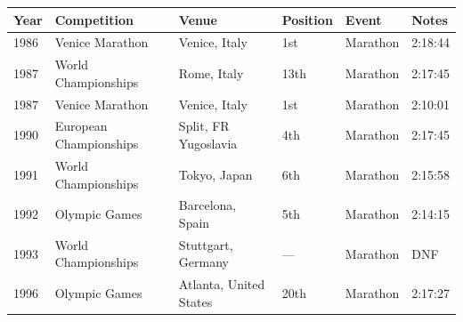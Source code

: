 \documentclass{article}
\begin{document}
\begin{tabular}{llllll}
\toprule
Year & Competition & Venue & Position & Event & Notes \\
\midrule
1986 & Venice Marathon & Venice, Italy & 1st & Marathon & 2:18:44 \\
1987 & World Championships & Rome, Italy & 13th & Marathon & 2:17:45 \\
1987 & Venice Marathon & Venice, Italy & 1st & Marathon & 2:10:01 \\
1990 & European Championships & Split, FR Yugoslavia & 4th & Marathon & 2:17:45 \\
1991 & World Championships & Tokyo, Japan & 6th & Marathon & 2:15:58 \\
1992 & Olympic Games & Barcelona, Spain & 5th & Marathon & 2:14:15 \\
1993 & World Championships & Stuttgart, Germany & — & Marathon & DNF \\
1996 & Olympic Games & Atlanta, United States & 20th & Marathon & 2:17:27 \\
\bottomrule
\end{tabular}
\end{document}
